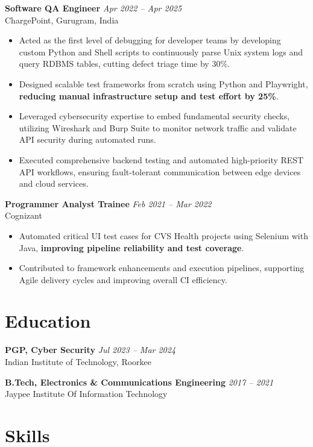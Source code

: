 \documentclass[a4paper,10pt]{article}
\begin{document}
\textbf{Software QA Engineer} \hfill \textit{Apr 2022 – Apr 2025}\\
ChargePoint, Gurugram, India
\begin{itemize}
    \item Acted as the first level of debugging for developer teams by developing custom Python and Shell scripts to continuously parse Unix system logs and query RDBMS tables, cutting defect triage time by 30\%.
    \item Designed scalable test frameworks from scratch using Python and Playwright, \textbf{reducing manual infrastructure setup and test effort by 25\%}.
    \item Leveraged cybersecurity expertise to embed fundamental security checks, utilizing Wireshark and Burp Suite to monitor network traffic and validate API security during automated runs.
    \item Executed comprehensive backend testing and automated high-priority REST API workflows, ensuring fault-tolerant communication between edge devices and cloud services.
\end{itemize}

\textbf{Programmer Analyst Trainee} \hfill \textit{Feb 2021 – Mar 2022}\\
Cognizant
\begin{itemize}
    \item Automated critical UI test cases for CVS Health projects using Selenium with Java, \textbf{improving pipeline reliability and test coverage}.
    \item Contributed to framework enhancements and execution pipelines, supporting Agile delivery cycles and improving overall CI efficiency.
\end{itemize}

\section{Education}

\textbf{PGP, Cyber Security} \hfill \textit{Jul 2023 – Mar 2024}\\
Indian Institute of Technology, Roorkee

\textbf{B.Tech, Electronics \& Communications Engineering} \hfill \textit{2017 – 2021}\\
Jaypee Institute Of Information Technology

\section{Skills}
\end{document}
